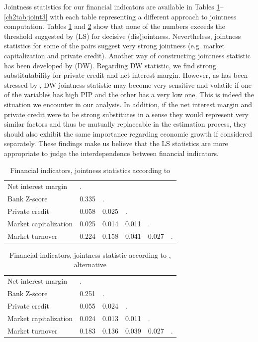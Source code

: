 \begin{refsection}
\begin{subappendices}
Jointness statistics for our financial indicators are available in Tables \ref{ch2tab:joint1}--\ref{ch2tab:joint3} with each table representing a different approach to jointness computation. Tables \ref{ch2tab:joint1} and \ref{ch2tab:joint2} show that none of the numbers exceeds the threshold suggested by \textcite{leysteel2007} (LS) for decisive (dis)jointness. Nevertheless, jointness statistics for some of the pairs suggest very strong jointness (e.g. market capitalization and private credit). Another way of constructing jointness statistic has been developed by \textcite{doppelhoferweeks2009} (DW). Regarding DW statistic, we find strong substitutability for private credit and net interest margin. However, as has been stressed by \textcite{leysteel2009b}, DW jointness statistic may become very sensitive and volatile if one of the variables has high \ac{PIP} and the other has a very low one. This is indeed the situation we encounter in our analysis. In addition, if the net interest margin and private credit were to be strong substitutes in a sense they would represent very similar factors and thus be mutually replaceable in the estimation process, they should also exhibit the same importance regarding economic growth if considered separately. These findings make us believe that the LS statistics are more appropriate to judge the interdependence between financial indicators.

\begin{table}[!htbp]
\caption{Financial indicators, jointness statistics according to \textcite{leysteel2007}}
\label{ch2tab:joint1}
\small
\centering
\begin{tabular}{llllll}
   \toprule
  Net interest margin & . & &  &  &  \\ 
  Bank Z-score & 0.335 & . & & & \\ 
  Private credit & 0.058 & 0.025 & . & &  \\ 
  Market capitalization & 0.025 & 0.014 & 0.011 & . & \\ 
  Market turnover & 0.224 & 0.158 & 0.041 & 0.027 & . \\ 
   \bottomrule
\end{tabular}
\end{table}

\begin{table}[!htbp]
\caption{Financial indicators, jointness statistic according to \textcite{leysteel2007}, alternative}
\label{ch2tab:joint2}
\small
\centering
\begin{tabular}{llllll}
   \toprule
  Net interest margin & . &  &  &  &  \\ 
  Bank Z-score & 0.251 & . &  &  &  \\ 
  Private credit & 0.055 & 0.024 & . &  &  \\ 
  Market capitalization & 0.024 & 0.013 & 0.011 & . &  \\ 
  Market turnover & 0.183 & 0.136 & 0.039 & 0.027 & . \\ 
   \bottomrule
\end{tabular}
\end{table}


\end{subappendices}
\end{refsection}
